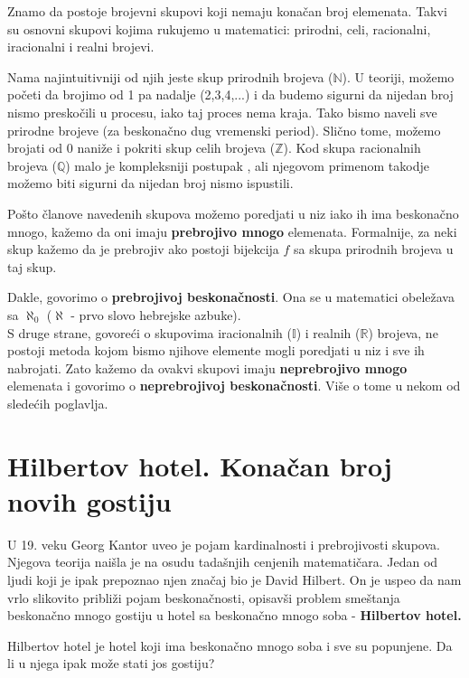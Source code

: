 \documentclass[a4paper]{article}
\begin{document}
Znamo da postoje brojevni skupovi koji nemaju konačan broj elemenata. Takvi su osnovni skupovi kojima rukujemo u matematici: prirodni, celi, racionalni, iracionalni i realni brojevi.

Nama najintuitivniji od njih jeste skup prirodnih brojeva ($\mathbb{N}$). U teoriji, možemo početi da brojimo od 1 pa nadalje (2,3,4,...) i da budemo sigurni da nijedan broj nismo preskočili u procesu, iako taj proces nema kraja. Tako bismo naveli sve prirodne brojeve (za beskonačno dug vremenski period). Slično tome, možemo brojati od 0 naniže i pokriti skup celih brojeva ($\mathbb{Z}$). Kod skupa racionalnih brojeva ($\mathbb{Q}$) malo je kompleksniji postupak \cite{Kantorov dijagonalni postupak}, ali njegovom primenom takodje možemo biti sigurni da nijedan broj nismo ispustili.

Pošto članove navedenih skupova možemo poredjati u niz iako ih ima beskonačno mnogo, kažemo da oni imaju \textbf{prebrojivo mnogo} elemenata. Formalnije, za neki skup kažemo da je prebrojiv ako postoji bijekcija $f$ sa skupa prirodnih brojeva u taj skup.

Dakle, govorimo o \textbf{prebrojivoj beskonačnosti}. Ona se u matematici obeležava sa $\aleph_{0}$ ($\aleph$ - prvo slovo hebrejske azbuke).\\

S druge strane, govoreći o skupovima iracionalnih ($\mathbb{I}$) i realnih ($\mathbb{R}$) brojeva, ne postoji metoda kojom bismo njihove elemente mogli poredjati u niz i sve ih nabrojati. Zato kažemo da ovakvi skupovi imaju \textbf{neprebrojivo mnogo} elemenata i govorimo o \textbf{neprebrojivoj beskonačnosti}. Više o tome u nekom od sledećih poglavlja.


\newpage

\section{Hilbertov hotel. Konačan broj novih gostiju}
\label{poglavlje:Hilbertov hotel. Konačan broj novih gostiju}
U 19. veku Georg Kantor uveo je pojam kardinalnosti i prebrojivosti skupova. Njegova teorija naišla je na osudu tadašnjih cenjenih matematičara.
Jedan od ljudi koji je ipak prepoznao njen značaj bio je David Hilbert\cite{David Hilbert}.
On je uspeo da nam vrlo slikovito približi pojam beskonačnosti, opisavši problem smeštanja beskonačno mnogo gostiju u hotel sa beskonačno mnogo soba - \textbf{Hilbertov hotel.}

Hilbertov hotel je hotel koji ima beskonačno mnogo soba i sve su popunjene. Da li u njega ipak može stati jos gostiju?
\end{document}
